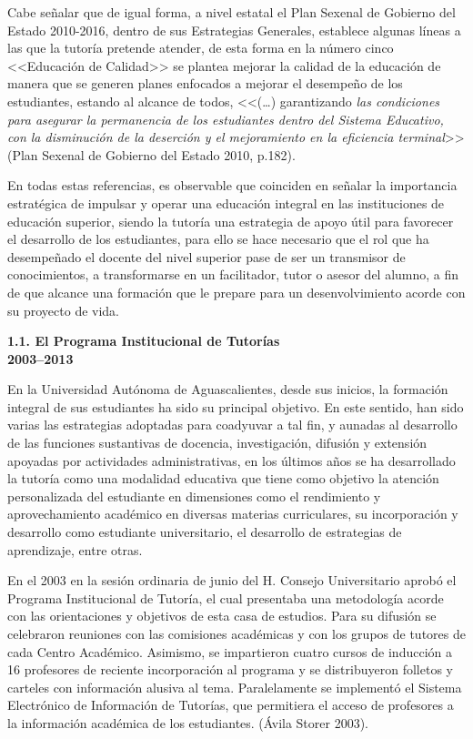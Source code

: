 Cabe señalar que de igual forma, a nivel estatal el Plan Sexenal de Gobierno
del Estado 2010-2016, dentro de sus Estrategias Generales, establece
algunas líneas a las que la tutoría pretende atender, de esta forma en la
número cinco <<Educación de Calidad>> se plantea mejorar la calidad de la
educación de manera que se generen planes enfocados a mejorar el desempeño
de los estudiantes, estando al alcance de todos, <<(\ldots) garantizando \textit{las
condiciones para asegurar la permanencia de los estudiantes dentro del
Sistema Educativo, con la disminución de la deserción y el
mejoramiento en la eficiencia terminal}>> (Plan Sexenal de Gobierno del
Estado 2010, p.182).

En todas estas referencias, es observable que coinciden en señalar la
importancia estratégica de impulsar y operar una educación integral en las
instituciones de educación superior, siendo la tutoría una estrategia de
apoyo útil para favorecer el desarrollo de los estudiantes, para ello se
hace necesario que el rol que ha desempeñado el docente del nivel superior
pase de ser un transmisor de conocimientos, a transformarse en un
facilitador, tutor o asesor del alumno, a fin de que alcance una formación
que le prepare para un desenvolvimiento acorde con su proyecto de vida.


\medskip
{\bfseries 1.1. El Programa Institucional de Tutorías\\ 2003--2013}

En la Universidad Autónoma de Aguascalientes, desde sus inicios, la
formación integral de sus estudiantes ha sido su principal objetivo. En
este sentido, han sido varias las estrategias adoptadas para coadyuvar a
tal fin, y aunadas al desarrollo de las funciones sustantivas de docencia,
investigación, difusión y extensión apoyadas por actividades
administrativas, en los últimos años se ha desarrollado la tutoría como una
modalidad educativa que tiene como objetivo la atención personalizada del
estudiante en dimensiones como el rendimiento y aprovechamiento académico
en diversas materias curriculares, su incorporación y desarrollo como
estudiante universitario, el desarrollo de estrategias de aprendizaje,
entre otras.

En el 2003 en la sesión ordinaria de junio del H. Consejo Universitario
aprobó el Programa Institucional de Tutoría, el cual presentaba una
metodología acorde con las orientaciones y objetivos de esta casa de
estudios. Para su difusión se celebraron reuniones con las comisiones
académicas y con los grupos de tutores de cada Centro Académico. Asimismo,
se impartieron cuatro cursos de inducción a 16 profesores de reciente
incorporación al programa y se distribuyeron folletos y carteles con
información alusiva al tema. Paralelamente se implementó el Sistema
Electrónico de Información de Tutorías, que permitiera el acceso de
profesores a la información académica de los estudiantes. (Ávila Storer
2003).

